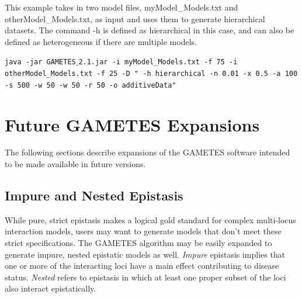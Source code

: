 \documentclass{report}
\begin{document}
This example takes in two model files, myModel\_Models.txt and otherModel\_Models.txt, as input and uses them to generate hierarchical datasets. The command -h is defined as hierarchical in this case, and can also be defined as heterogeneous if there are multiple models. 

\begin{center}
\texttt{java -jar GAMETES$\_$2.1.jar -i myModel\_Models.txt -f 75 -i otherModel\_Models.txt -f 25 -D " -h hierarchical -n 0.01 -x 0.5 -a 100 -s 500 -w 50 -w 50 -r 50 -o additiveData"}
\end{center}


\chapter{Future GAMETES Expansions} 
The following sections describe expansions of the GAMETES software intended to be made available in future versions.

\section{Impure and Nested Epistasis} 
While pure, strict epistasis makes a logical gold standard for complex multi-locus interaction models, users may want to generate models that don't meet these strict specifications.  The GAMETES algorithm may be easily expanded to generate impure, nested epistatic models as well.  \emph{Impure} epistasis implies that one or more of the interacting loci have a main effect contributing to disease status.  \emph{Nested} refers to epistasis in which at least one proper subset of the loci also interact epistatically.



\end{document}

